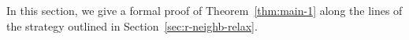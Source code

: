 \documentclass[11pt]{article}
\newcommand{\R}{\mathbb{R}}
\newcommand{\one}{\mathbf{1}}
\DeclareMathOperator{\supp}{supp}
\DeclareMathOperator{\conv}{conv}
\theoremstyle{remark}
\begin{document}
%
%

In this section, we give a formal proof of Theorem~\ref{thm:main-1} along the lines of the strategy outlined in Section~\ref{sec:r-neighb-relax}.
\end{document}
